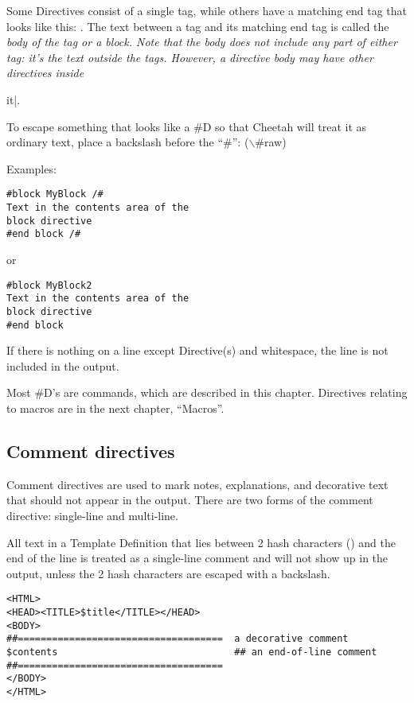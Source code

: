 Some Directives consist of a single tag, while others have a matching end tag
that looks like this: .  The text between a tag and
its matching end tag is called the \em{body} of the tag or a \em{block}.  Note
that the body does not include any part of either tag: it's the text
\em{outside} the tags.  However, a directive body may have other directives
inside \em{it|.

To escape something that looks like a #D so that Cheetah will treat it as
ordinary text, place a backslash before the ``#'':
($\backslash$#raw) 

Examples:

\begin{verbatim}
#block MyBlock /#
Text in the contents area of the
block directive
#end block /#
\end{verbatim}
or
\begin{verbatim}
#block MyBlock2
Text in the contents area of the
block directive
#end block
\end{verbatim}


If there is nothing on a line except Directive(s) and whitespace, the line is
not included in the output.


Most #D's are commands, which are described in this chapter.  Directives
relating to macros are in the next chapter, ``Macros''.


\subsection{Comment directives}

Comment directives are used to mark notes, explanations, and decorative text
that should not appear in the output.  There are two forms of the comment
directive: single-line and multi-line.

All text in a Template Definition that lies between 2 hash characters
(\code{\#\#}) and the end of the line is treated as a single-line comment and
will not show up in the output, unless the 2 hash characters are escaped with a
backslash.
\begin{verbatim}
<HTML>
<HEAD><TITLE>$title</TITLE></HEAD>
<BODY>
##====================================  a decorative comment
$contents                               ## an end-of-line comment
##====================================
</BODY>
</HTML>
\end{verbatim}

}
